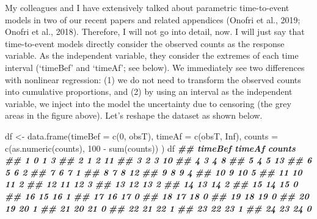 \documentclass[
]{book}
\newenvironment{Shaded}{\begin{snugshade}}{\end{snugshade}}
\newcommand{\AttributeTok}[1]{\textcolor[rgb]{0.77,0.63,0.00}{#1}}
\newcommand{\ConstantTok}[1]{\textcolor[rgb]{0.00,0.00,0.00}{#1}}
\newcommand{\DecValTok}[1]{\textcolor[rgb]{0.00,0.00,0.81}{#1}}
\newcommand{\DocumentationTok}[1]{\textcolor[rgb]{0.56,0.35,0.01}{\textbf{\textit{#1}}}}
\newcommand{\FunctionTok}[1]{\textcolor[rgb]{0.00,0.00,0.00}{#1}}
\newcommand{\NormalTok}[1]{#1}
\newcommand{\OtherTok}[1]{\textcolor[rgb]{0.56,0.35,0.01}{#1}}
\newcommand{\SpecialCharTok}[1]{\textcolor[rgb]{0.00,0.00,0.00}{#1}}
\begin{document}
My colleagues and I have extensively talked about parametric time-to-event models in two of our recent papers and related appendices (Onofri et al., 2019; Onofri et al., 2018). Therefore, I will not go into detail, now. I will just say that time-to-event models directly consider the observed counts as the response variable. As the independent variable, they consider the extremes of each time interval (`timeBef' and `timeAf'; see below). We immediately see two differences with nonlinear regression: (1) we do not need to transform the observed counts into cumulative proportions, and (2) by using an interval as the independent variable, we inject into the model the uncertainty due to censoring (the grey areas in the figure above). Let's reshape the dataset as shown below.

\begin{Shaded}
\begin{Highlighting}[]
\NormalTok{df }\OtherTok{\textless{}{-}} \FunctionTok{data.frame}\NormalTok{(}\AttributeTok{timeBef =} \FunctionTok{c}\NormalTok{(}\DecValTok{0}\NormalTok{, obsT), }\AttributeTok{timeAf =} \FunctionTok{c}\NormalTok{(obsT, }\ConstantTok{Inf}\NormalTok{), }\AttributeTok{counts =} \FunctionTok{c}\NormalTok{(}\FunctionTok{as.numeric}\NormalTok{(counts), }\DecValTok{100} \SpecialCharTok{{-}} \FunctionTok{sum}\NormalTok{(counts)) )}
\NormalTok{df}
\DocumentationTok{\#\#    timeBef timeAf counts}
\DocumentationTok{\#\# 1        0      1      3}
\DocumentationTok{\#\# 2        1      2     11}
\DocumentationTok{\#\# 3        2      3     10}
\DocumentationTok{\#\# 4        3      4      8}
\DocumentationTok{\#\# 5        4      5     13}
\DocumentationTok{\#\# 6        5      6      2}
\DocumentationTok{\#\# 7        6      7      1}
\DocumentationTok{\#\# 8        7      8     12}
\DocumentationTok{\#\# 9        8      9      4}
\DocumentationTok{\#\# 10       9     10      5}
\DocumentationTok{\#\# 11      10     11      2}
\DocumentationTok{\#\# 12      11     12      3}
\DocumentationTok{\#\# 13      12     13      2}
\DocumentationTok{\#\# 14      13     14      2}
\DocumentationTok{\#\# 15      14     15      0}
\DocumentationTok{\#\# 16      15     16      1}
\DocumentationTok{\#\# 17      16     17      0}
\DocumentationTok{\#\# 18      17     18      0}
\DocumentationTok{\#\# 19      18     19      0}
\DocumentationTok{\#\# 20      19     20      1}
\DocumentationTok{\#\# 21      20     21      0}
\DocumentationTok{\#\# 22      21     22      1}
\DocumentationTok{\#\# 23      22     23      1}
\DocumentationTok{\#\# 24      23     24      0}

\end{Highlighting}
\end{Shaded}
\end{document}

